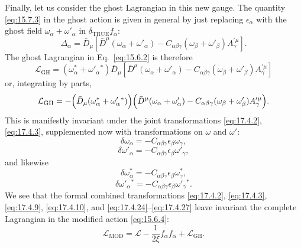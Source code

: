 Finally, let us consider the ghost Lagrangian in this new gauge. The quantity
\eqref{eq:15.7.3} in the ghost action is given in general by just replacing
$\epsilon_\alpha$ with the ghost field $\omega_\alpha+\omega'_\alpha$ in
$\delta_{\mathrm{TRUE}}f_\alpha$:
\begin{equation}
\Delta_\alpha=\bar D_\mu\left[
\bar D^\mu(\omega_\alpha+\omega'_\alpha)
-C_{\alpha\beta\gamma}(\omega_\beta+\omega'_\beta)
A_\gamma^{\prime\mu}\right].
\label{eq:17.4.21}
\end{equation}
The ghost Lagrangian in Eq.~\eqref{eq:15.6.2} is therefore
\begin{equation}
\mathcal L_{\mathrm{GH}}
=(\omega_\alpha^*+\omega'_\alpha{}^*)\bar D_\mu\left[
\bar D^\mu(\omega_\alpha+\omega'_\alpha)
-C_{\alpha\beta\gamma}(\omega_\beta+\omega'_\beta)
A_\gamma^{\prime\mu}\right]
\label{eq:17.4.22}
\end{equation}
or, integrating by parts,
\begin{equation}
\mathcal L_{\mathrm{GH}}
=-\Bigl(\bar D_\mu(\omega_\alpha^*+\omega'_\alpha{}^*)\Bigr)
\Bigl(\bar D^\mu(\omega_\alpha+\omega'_\alpha)
-C_{\alpha\beta\gamma}(\omega_\beta+\omega'_\beta)
A_\gamma^{\prime\mu}\Bigr).
\label{eq:17.4.23}
\end{equation}
This is manifestly invariant under the joint transformations
\eqref{eq:17.4.2}, \eqref{eq:17.4.3}, supplemented now with
transformations on $\omega$ and $\omega'$:
\begin{equation}
\delta\omega_\alpha
=-C_{\alpha\beta\gamma}\epsilon_\beta\omega_\gamma,
\label{eq:17.4.24}
\end{equation}
\begin{equation}
\delta\omega'_\alpha
=-C_{\alpha\beta\gamma}\epsilon_\beta\omega'_\gamma,
\label{eq:17.4.25}
\end{equation}
and likewise
\begin{equation}
\delta\omega_\alpha^*
=-C_{\alpha\beta\gamma}\epsilon_\beta\omega_\gamma^*,
\label{eq:17.4.26}
\end{equation}
\begin{equation}
\delta\omega'_\alpha{}^*
=-C_{\alpha\beta\gamma}\epsilon_\beta\omega'_\gamma{}^*.
\label{eq:17.4.27}
\end{equation}
We see that the formal combined transformations \eqref{eq:17.4.2},
\eqref{eq:17.4.3}, \eqref{eq:17.4.9}, \eqref{eq:17.4.10}, and
\eqref{eq:17.4.24}--\eqref{eq:17.4.27} leave invariant the complete
Lagrangian in the modified action \eqref{eq:15.6.4}:
\begin{equation}
\mathcal L_{\mathrm{MOD}}
=\mathcal L-\frac1{2\xi}f_\alpha f_\alpha+\mathcal L_{\mathrm{GH}}.
\label{eq:17.4.28}
\end{equation}

